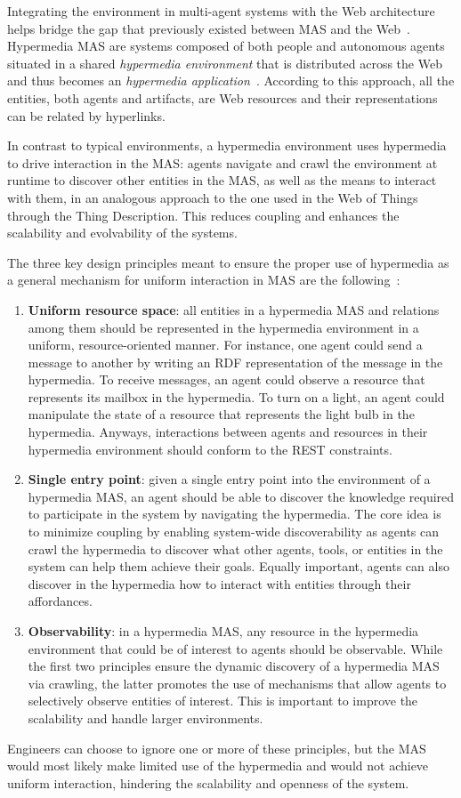 Integrating the environment in multi-agent systems with the Web architecture helps bridge the gap that previously existed between MAS and the Web~\cite{ciortea2019}.
Hypermedia MAS are systems composed of both people and autonomous agents situated in a shared \textit{hypermedia environment} that is distributed across the Web and thus becomes an \textit{hypermedia application}~\cite{ciortea2018}.
According to this approach, all the entities, both agents and artifacts, are Web resources and their representations can be related by hyperlinks.

In contrast to typical environments, a hypermedia environment uses hypermedia to drive interaction in the MAS: agents navigate and crawl the environment at runtime to discover other entities in the MAS, as well as the means to interact with them, in an analogous approach to the one used in the Web of Things through the Thing Description.
This reduces coupling and enhances the scalability and evolvability of the systems.

The three key design principles meant to ensure the proper use of hypermedia as a general mechanism for uniform interaction in MAS are the following~\cite{10.1007/978-3-030-25693-7_15}:
\begin{enumerate}
    \item \textbf{Uniform resource space}: all entities in a hypermedia MAS and relations among them should be represented in the hypermedia environment in a uniform, resource-oriented manner.
    For instance, one agent could send a message to another by writing an RDF representation of the message in the hypermedia.
    To receive messages, an agent could observe a resource that represents its mailbox in the hypermedia.
    To turn on a light, an agent could manipulate the state of a resource that represents the light bulb in the hypermedia.
    Anyways, interactions between agents and resources in their hypermedia environment should conform to the REST constraints.
    \item \textbf{Single entry point}: given a single entry point into the environment of a hypermedia MAS, an agent should be able to discover the knowledge required to participate in the system by navigating the hypermedia.
    The core idea is to minimize coupling by enabling system-wide discoverability as agents can crawl the hypermedia to discover what other agents, tools, or entities in the system can help them achieve their goals.
    Equally important, agents can also discover in the hypermedia how to interact with entities through their affordances.
    \item \textbf{Observability}: in a hypermedia MAS, any resource in the hypermedia environment that could be of interest to agents should be observable.
    While the first two principles ensure the dynamic discovery of a hypermedia MAS via crawling, the latter promotes the use of mechanisms that allow agents to selectively observe entities of interest.
    This is important to improve the scalability and handle larger environments.
\end{enumerate}

Engineers can choose to ignore one or more of these principles, but the MAS would most likely make limited use of the hypermedia and would not achieve uniform interaction, hindering the scalability and openness of the system.


